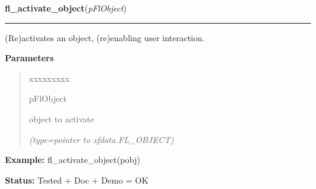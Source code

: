 \hspace{.8\funcindent}\begin{boxedminipage}{\funcwidth}

    \raggedright \textbf{fl\_activate\_object}(\textit{pFlObject})

    \vspace{-1.5ex}

    \rule{\textwidth}{0.5\fboxrule}
\setlength{\parskip}{2ex}
    (Re)activates an object, (re)enabling user interaction.

\setlength{\parskip}{1ex}
      \textbf{Parameters}
      \vspace{-1ex}

      \begin{quote}
        \begin{Ventry}{xxxxxxxxx}

          \item[pFlObject]

          object to activate

            {\it (type=pointer to xfdata.FL\_OBJECT)}

        \end{Ventry}

      \end{quote}

\textbf{Example:} fl\_activate\_object(pobj)



\textbf{Status:} Tested + Doc + Demo = OK



    \end{boxedminipage}

    \label{xformslib:flbasic:fl_deactivate_object}

    \vspace{0.5ex}

